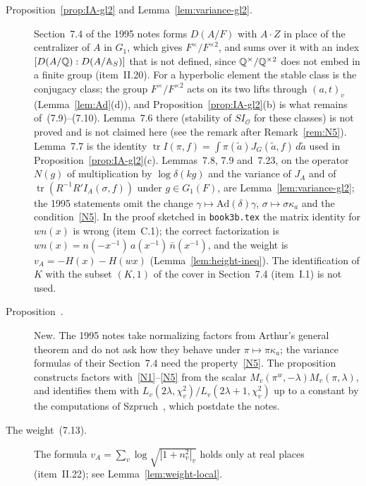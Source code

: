 \begin{description}
\item[Proposition~\ref{prop:IA-gl2} and Lemma~\ref{lem:variance-gl2}.] Section~7.4 of the 1995 notes forms $D(A/F)$ with $A\cdot Z$ in place of the centralizer of $A$ in $G_1$, which gives $F^\times/F^{\times2}$, and sums over it with an index $[D(A/\mathbb{Q}):D(A/\mathbb{A}_S)]$ that is not defined, since $\mathbb{Q}^\times/\mathbb{Q}^{\times2}$ does not embed in a finite group (item~II.20). For a hyperbolic element the stable class is the conjugacy class; the group $F^\times/F^{\times2}$ acts on its two lifts through $(a,t)_v$ (Lemma~\ref{lem:Ad}(d)), and Proposition~\ref{prop:IA-gl2}(b) is what remains of~(7.9)--(7.10). Lemma~7.6 there (stability of $SI_{\mathcal O}$ for these classes) is not proved and is not claimed here (see the remark after Remark~\ref{rem:N5}). Lemma~7.7 is the identity $\operatorname{tr}I(\pi,f)=\int\pi(\tilde a)J_G(\tilde a,f)\,d\tilde a$ used in Proposition~\ref{prop:IA-gl2}(c). Lemmas~7.8, 7.9 and~7.23, on the operator $N(g)$ of multiplication by $\log\delta(kg)$ and the variance of $J_A$ and of $\operatorname{tr}(R^{-1}R'I_A(\sigma,f))$ under $g\in G_1(F)$, are Lemma~\ref{lem:variance-gl2}; the 1995 statements omit the change $\gamma\mapsto\mathrm{Ad}(\delta)\gamma$, $\sigma\mapsto\sigma\kappa_a$ and the condition~\ref{N5}. In the proof sketched in \texttt{book3b.tex} the matrix identity for $wn(x)$ is wrong (item~C.1); the correct factorization is $wn(x)=n(-x^{-1})\,a(x^{-1})\,\bar n(x^{-1})$, and the weight is $v_A=-H(x)-H(wx)$ (Lemma~\ref{lem:height-ineq}). The identification of $K$ with the subset $(K,1)$ of the cover in Section~7.4 (item~I.1) is not used.
\item[Proposition~\normref.] New. The 1995 notes take normalizing factors from Arthur's general theorem and do not ask how they behave under $\pi\mapsto\pi\kappa_a$; the variance formulas of their Section~7.4 need the property~\ref{N5}. The proposition constructs factors with~\ref{N1}--\ref{N5} from the scalar $M_v(\pi^w,-\lambda)M_v(\pi,\lambda)$, and identifies them with $L_v(2\lambda,\chi_v^2)/L_v(2\lambda+1,\chi_v^2)$ up to a constant by the computations of Szpruch~\cite{Sz09,Sz16}, which postdate the notes.

\item[The weight~(7.13).] The formula $v_A=\sum_v\log\sqrt{|1+n_v^2|_v}$ holds only at real places (item~II.22); see Lemma~\ref{lem:weight-local}.


\end{description}
